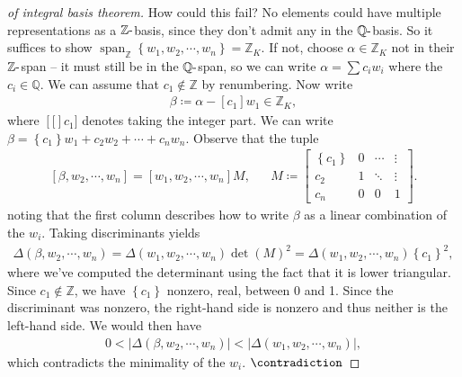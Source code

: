 \begin{proof}[of integral basis theorem]
How could this fail? No elements could have multiple representations as
a \({\mathbb{Z}}{\hbox{-}}\)basis, since they don't admit any in the
\({\mathbb{Q}}{\hbox{-}}\)basis. So it suffices to show
\({\operatorname{span}}_{\mathbb{Z}}\left\{{ { {w}_1, {w}_2, \cdots, {w}_{n}} }\right\} = {\mathbb{Z}}_K\).
If not, choose \(\alpha\in {\mathbb{Z}}_K\) not in their
\({\mathbb{Z}}{\hbox{-}}\)span -- it must still be in the
\({\mathbb{Q}}{\hbox{-}}\)span, so we can write \(\alpha= \sum c_i w_i\)
where the \(c_i\in {\mathbb{Q}}\). We can assume that
\(c_1\not \in {\mathbb{Z}}\) by renumbering. Now write
\begin{align*}
\beta \coloneqq\alpha - \left[ {c_1}\right]  w_1 \in {\mathbb{Z}}_K
,\end{align*}
where \(\left[ {[}\right] c_1]\) denotes taking the integer part. We can
write \(\beta = \left\{{c_1}\right\}w_1 + c_2 w_2 + \cdots + c_n w_n\).
Observe that the tuple
\begin{align*}
{\left[ { \beta, w_2, \cdots, w_n} \right]} 
= {\left[ { w_1 , w_2, \cdots, w_n} \right]} 
M,
&& 
M \coloneqq
\begin{bmatrix}
\left\{{c_1}\right\} & 0  & \cdots & \vdots \\
c_2 &  1 & \ddots & \vdots \\
c_n &  0 & 0 & 1
\end{bmatrix}
.\end{align*}
noting that the first column describes how to write \(\beta\) as a
linear combination of the \(w_i\). Taking discriminants yields
\begin{align*}
{\Delta}(\beta, w_2, \cdots, w_n) 
= {\Delta}( { {w}_1, {w}_2, \cdots, {w}_{n}} )\det(M)^2
= {\Delta}( { {w}_1, {w}_2, \cdots, {w}_{n}} )\left\{{c_1}\right\}^2
,\end{align*}
where we've computed the determinant using the fact that it is lower
triangular. Since \(c_1\not\in{\mathbb{Z}}\), we have
\(\left\{{c_1}\right\}\) nonzero, real, between 0 and 1. Since the
discriminant was nonzero, the right-hand side is nonzero and thus
neither is the left-hand side. We would then have
\begin{align*}
0 < 
{\left\lvert { {\Delta}( \beta, w_2, \cdots, w_n) } \right\rvert}
<
{\left\lvert { {\Delta}( { {w}_1, {w}_2, \cdots, {w}_{n}} ) } \right\rvert}
,\end{align*}
which contradicts the minimality of the \(w_i\). \(\contradiction\)

\end{proof}

